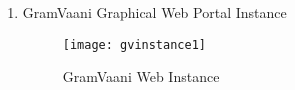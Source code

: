 
\begin{enumerate}

\item GramVaani Graphical Web Portal Instance
\begin{figure}[here]
\begin{center}   
\texttt{[image: gvinstance1]}
\caption{GramVaani Web Instance}
\label{fig:gvinstance1}
\end{center}
\end{figure}

\end{enumerate}